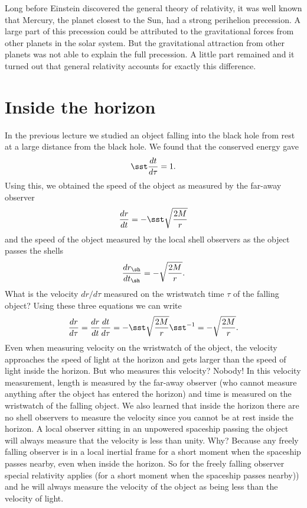 \begin{multicols}{2}
Long before Einstein discovered the general theory of relativity, it was well known that Mercury, the planet closest to the Sun, had a strong perihelion precession. A large part of this precession could be attributed to the gravitational forces from other planets in the solar system. But the gravitational attraction from other planets was not able to explain the full precession. A little part remained and it turned out that general relativity accounts for exactly this difference.

\section{Inside the horizon}

In the previous lecture we studied an object falling into the black hole from rest at a large distance from the black hole. We found that the conserved energy gave
\[
\sst\frac{dt}{d\tau}=1.
\]
Using this, we obtained the speed of the object as measured by the far-away observer
\[
\frac{dr}{dt}=-\sst\sqrt{\frac{2M}{r}}
\]
and the speed of the object measured by the local shell observers as the object passes the shells
\[
\frac{dr_\sh}{dt_\sh}=-\sqrt{\frac{2M}{r}}.
\]
What is the velocity $dr/d\tau$ measured on the wristwatch time $\tau$ of the falling object? Using these three equations we can write
\begin{equation}
\label{eq:ff}
\frac{dr}{d\tau}=\frac{dr}{dt}\frac{dt}{d\tau}=-\sst\sqrt{\frac{2M}{r}}\sst^{-1}=-\sqrt{\frac{2M}{r}}.
\end{equation}
Even when measuring velocity on the wristwatch of the object, the velocity approaches the speed of light at the horizon and gets larger than the speed of light inside the horizon. But who measures this velocity? Nobody! In this velocity measurement, length is measured by the far-away observer (who cannot measure anything after the object has entered the horizon) and time is measured on the wristwatch of the falling object. We also learned that inside the horizon there are no shell observers to measure the velocity since you cannot be at rest inside the horizon. A local observer sitting in an unpowered spaceship passing the object will always measure that the velocity is less than unity. Why? Because any freely falling observer is in a local inertial frame for a short moment when the spaceship passes nearby, even when inside the horizon. So for the freely falling observer special relativity applies (for a short moment when the spaceship passes nearby)) and he will always measure the velocity of the object as being less than the velocity of light.


\end{multicols}
